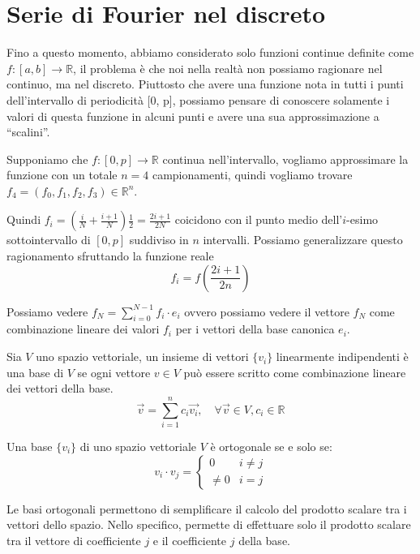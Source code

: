 \section{Serie di Fourier nel discreto}
Fino a questo momento, abbiamo considerato solo funzioni continue definite come
$f:[a,b]\to \mathbb{R}$, il problema è che noi nella realtà non possiamo ragionare
nel continuo, ma nel discreto. Piuttosto che avere una funzione nota in tutti i
punti dell'intervallo di periodicità [0, p], possiamo pensare di conoscere solamente
i valori di questa funzione in alcuni punti e avere una sua approssimazione a “scalini”.

Supponiamo che $f:[0,p] \to \mathbb{R}$ continua nell'intervallo, vogliamo approssimare
la funzione con un totale $n = 4$ campionamenti, quindi vogliamo trovare $f_4 = (f_0, f_1,f_2,f_3)\in \mathbb{R}^n$.

Quindi $f_i = (\frac{i}{N} + \frac{i+1}{N}) \frac{1}{2} = \frac{2i+1}{2N}$ coicidono 
con il punto medio dell'$i$-esimo sottointervallo di $[0,p]$ suddiviso in $n$ intervalli.
Possiamo generalizzare questo ragionamento sfruttando la funzione reale
$$f_i = f(\frac{2i+1}{2n})$$

Possiamo vedere $f_N = \sum_{i=0}^{N-1} f_i \cdot e_i$ ovvero possiamo vedere il vettore 
$f_N$ come combinazione lineare dei valori $f_i$ per i vettori della base canonica 
$e_i$.

\begin{definizione}
    Sia $V$ uno spazio vettoriale, un insieme di vettori $\{v_i\}$ linearmente
    indipendenti è una base di $V$ se ogni vettore $v \in V$ può essere scritto
    come combinazione lineare dei vettori della base.
    \begin{equation}
        \vec{v} = \sum_{i=1}^{n} c_i \vec{v_i}, \quad \forall \vec{v} \in V, c_i \in \mathbb{R}
    \end{equation}
\end{definizione}
\begin{definizione}
    Una base $\{v_i\}$ di uno spazio vettoriale $V$ è ortogonale se e solo se:
    \begin{equation}
        v_i\cdot v_j = \begin{cases}
            0     & i\ne j \\
            \ne 0 & i = j
        \end{cases}
    \end{equation}
\end{definizione}
Le basi ortogonali permettono di semplificare il calcolo del prodotto scalare
tra i vettori dello spazio. Nello specifico, permette di effettuare solo il prodotto 
scalare tra il vettore di coefficiente $j$ e il coefficiente $j$ della base.

